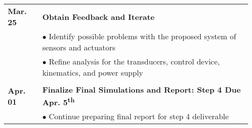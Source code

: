 \documentclass[12pt]{article}
\newcommand{\ts}{\textsuperscript}
\begin{document}
\begin{flushleft}
\begin{tabular}{l | l}
\textbf{Mar. 25} & \textbf{Obtain Feedback and Iterate}\\
  & $\bullet$ Identify possible problems with the proposed system of sensors and actuators\\
  & $\bullet$ Refine analysis for the transducers, control device, kinematics, and power supply\\\\
  
\textbf{Apr. 01} & \textbf{Finalize Final Simulations and Report: Step 4 Due Apr. 5\ts{th}}\\
 & $\bullet$ Continue preparing final report for step 4 deliverable\\

\end{tabular}
\end{flushleft}
\end{document}
